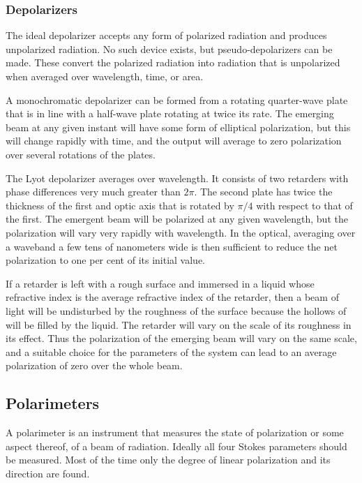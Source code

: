 \documentclass{article}
\begin{document}
\subsubsection{Depolarizers}

The ideal depolarizer accepts any form of polarized radiation and produces unpolarized
radiation. No such device exists, but pseudo-depolarizers can be made. These convert the polarized radiation into radiation that is unpolarized when averaged over wavelength, time, or area. 

A monochromatic depolarizer can be formed from a rotating quarter-wave plate that is in
line with a half-wave plate rotating at twice its rate. The emerging beam at any given instant will have some form of elliptical polarization, but this will change rapidly with time, and the output will average to zero polarization over several rotations of the plates. 

The Lyot depolarizer averages over wavelength. It consists of two retarders with phase differences very much greater than $2\pi$. The second plate has twice the thickness of the first and optic axis that is rotated by $\pi/4$ with respect to that of the first. The emergent beam will be polarized at any given wavelength, but the polarization will vary very rapidly with wavelength. In the optical, averaging over a waveband a few tens of nanometers wide is then sufficient to reduce the net polarization to one per cent of its initial value. 

If a retarder is left with a rough surface and immersed in a liquid whose refractive index is the average refractive index of the retarder, then a beam of light will be undisturbed by the roughness of the surface because the hollows of will be filled by the liquid. The retarder will vary on the scale of its roughness in its effect. Thus the polarization of the emerging beam will vary on the same scale, and a suitable choice for the parameters of the system can lead to an average polarization of zero over the whole beam.

\subsection{Polarimeters}

A polarimeter is an instrument that measures the state of polarization or some aspect thereof, of a beam of radiation. Ideally all four Stokes parameters should be measured. Most of the time only the degree of linear polarization and its direction are found.
\end{document}

